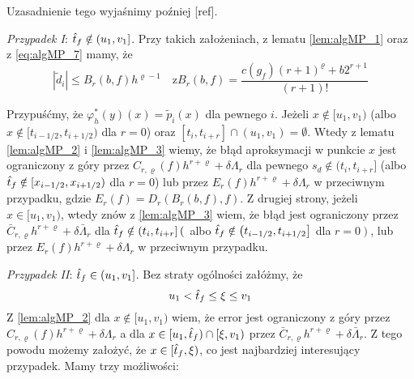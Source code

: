 \documentclass[oik, pdftex, robocza, man]{mgrwms}
\begin{document}
    Uzasadnienie tego wyjaśnimy poźniej [ref].

    \textit{Przypadek I}: $\hat{t}_{f} \notin (u_{1}, v_{1}]$.
    Przy takich założeniach, z lematu \eqref{lem:algMP_1} oraz z \eqref{eq:algMP_7} mamy, że
    \begin{equation*}
        |\tilde{d}_{i}| \leq B_{r}(b, f) h^{\varrho-1} \quad \text{z} B_{r}(b, f)=\frac{c\left(g_{f}\right)(r+1)^{\varrho}+b 2^{r+1}}{(r+1) !}
    \end{equation*}

    Przypuśćmy, że $\varphi_{h}^{*}(y)(x) = \tilde{p}_{i}(x)$ dla pewnego $i$. Jeżeli $x \notin [u_{1}, v_{1})$ (albo $x \notin [t_{i-1/2}, t_{i+1/2})$ dla $r=0$) oraz $[t_{i}, t_{i+r}] \cap (u_{1}, v_{1}) = \emptyset$. Wtedy z lematu \eqref{lem:algMP_2} i \eqref{lem:algMP_3} wiemy, że błąd aproksymacji w punkcie $x$ jest ograniczony z góry przez $C_{r,\varrho}(f)h^{r+\varrho} + \delta \Lambda_{r}$ dla pewnego $s_{d} \notin (t_{i}, t_{i+r}]$ (albo $\hat{t}_{f} \notin [x_{i-1/2}, x_{i+1/2})$ dla $r=0$) lub przez $E_{r}(f)h^{r+\varrho} + \delta \Lambda_{r}$ w przeciwnym przypadku, gdzie $E_{r}(f) = D_{r}(B_{r}(b, f), f)$.
    Z drugiej strony, jeżeli $x \in [u_{1}, v_{1})$, wtedy znów z \eqref{lem:algMP_3} wiem, że błąd jest ograniczony przez $\bar{C}_{r, \varrho} h^{r+\varrho}+\delta \bar{\Lambda}_{r}$ dla $\hat{t}_{f} \notin \left(t_{i}, t_{i+r}\right]\left(\right.$ albo $\hat{t}_{f} \notin\left(t_{i-1 / 2}, t_{i+1 / 2}\right]$ dla $\left.r=0\right)$, lub przez $E_{r}(f) h^{r+\varrho}+\delta \Lambda_{r}$ w przeciwnym przypadku.

    \textit{Przypadek II}: $\hat{t}_{f} \in (u_{1}, v_{1}]$.
    Bez straty ogólności załóżmy, że
    \begin{equation*}
        u_{1} < \hat{t}_{f} \leq \xi \leq v_{1}
    \end{equation*}
    Z \eqref{lem:algMP_2} dla $x \notin [u_{1}, v_{1})$ wiem, że error jest ograniczony z góry przez $C_{r, \varrho}(f) h^{r+\varrho}+\delta \Lambda_{r}$ a dla $x \in [u_{1}, \hat{t}_{f}) \cap [\xi, v_{1})$ przez $\bar{C}_{r, \varrho} h^{r+\varrho}+\delta \bar{\Lambda}_{r}$. Z tego powodu możemy założyć, że $x \in [\hat{t}_{f}, \xi)$, co jest najbardziej interesujący przypadek. Mamy trzy możliwości:
\end{document}
